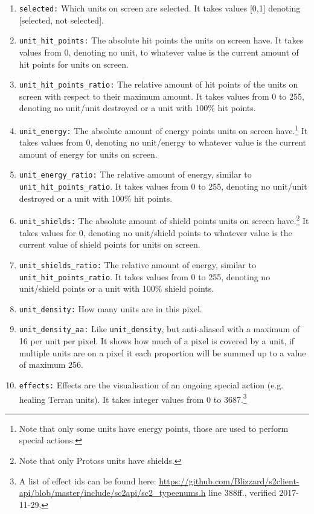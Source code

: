 \documentclass{article}
\begin{document}
\begin{enumerate}[noitemsep,start=0]
an integer from 0 to 894.\footnote{A list of unit ids can be found here: 
\url{https://github.com/Blizzard/s2client-api/blob/master/include/sc2api/sc2_typeenums.h}
 line 25ff., verified 2017-11-29.}
\item \texttt{selected:} Which units on screen are selected. It takes values 
[0,1] denoting [selected, not selected].
\item \texttt{unit\_hit\_points:} The absolute hit points the units on screen 
have. It takes values from 0, denoting no unit, to whatever value is the 
current amount of hit points for units on screen.
\item \texttt{unit\_hit\_points\_ratio:} The relative amount of hit points of 
the units on screen with respect to their maximum amount. It takes values from 
0 to 255, denoting no unit/unit destroyed or a unit with 100\% hit points.
\item \texttt{unit\_energy:} The absolute amount of energy points units on 
screen have.\footnote{Note that only some units have energy points, those are 
used to perform special actions.} It takes values from 0, denoting no 
unit/energy to whatever value is the current amount of energy for units on 
screen.
\item \texttt{unit\_energy\_ratio:} The relative amount of energy, similar to 
\texttt{unit\_hit\_points\_ratio}. It takes values from 0 to 255, denoting no 
unit/unit destroyed or a unit with 100\% hit points.
\item \texttt{unit\_shields:} The absolute amount of shield points units on 
screen have.\footnote{Note that only Protoss units have shields.} It takes 
values for 0, denoting no unit/shield points to whatever value is the current 
value of shield points for units on screen.
\item \texttt{unit\_shields\_ratio:} The relative amount of energy, similar to 
\texttt{unit\_hit\_points\_ratio}. It takes values from 0 to 255, denoting no 
unit/shield points or a unit with 100\% shield points.
\item \texttt{unit\_density:} How many units are in this pixel.
\item \texttt{unit\_density\_aa:} Like \texttt{unit\_density}, but anti-aliased 
with a maximum of 16 per unit per pixel. It shows how much of a pixel is 
covered by a unit, if multiple units are on a pixel it each proportion will be 
summed up to a value of maximum 256.
\item \texttt{effects:} Effects are the visualisation of an ongoing special 
action (e.g. healing Terran units). It takes integer values from 0 to 
3687.\footnote{A list of effect ids can be found here: 
\url{https://github.com/Blizzard/s2client-api/blob/master/include/sc2api/sc2_typeenums.h}
 line 388ff., verified 2017-11-29.}
\end{enumerate}
\end{document}
